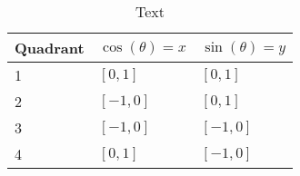 \begin{table}
	\caption{Text}
	\label{tab:quadrants_trig_vals}
	\centering
	\begin{tabular}{lll}
		\toprule
		Quadrant & $\cos(\theta)=x$ & $\sin(\theta)=y$\\
		\midrule
		\rowcolor{xred!35}1 & $\left[ 0,1 \right]$ & $\left[ 0,1 \right]$\\
		\rowcolor{xblue!35}2 & $\left[-1,0 \right]$ & $\left[ 0,1 \right]$\\
		\rowcolor{xgreen!35}3 & $\left[-1,0 \right]$ & $\left[-1,0 \right]$\\
		\rowcolor{xorange!35}4 & $\left[ 0,1 \right]$ & $\left[-1,0 \right]$\\
		\bottomrule
	\end{tabular}
\end{table}
